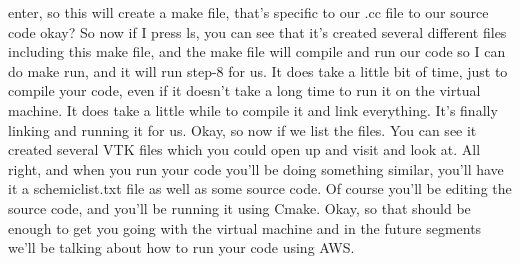 \documentclass[10pt]{article}
\begin{document}
enter, so this will create a make file, that's specific to our .cc file to our source code okay? So now if I press ls, you can see that it's created several different files including this make file, and the make file will compile and run our code so I can do make run, and it will run step-8 for us. It does take a little bit of time, just to compile your code, even if it doesn't take a long time to run it on the virtual machine. It does take a little while to compile it and link everything. It's finally linking and running it for us. Okay, so now if we list the files. You can see it created several VTK files which you could open up and visit and look at. All right, and when you run your code you'll be doing something similar, you'll have it a schemiclist.txt file as well as some source code. Of course you'll be editing the source code, and you'll be running it using Cmake. Okay, so that should be enough to get you going with the virtual machine and in the future segments we'll be talking about how to run your code using AWS.
\end{document}
